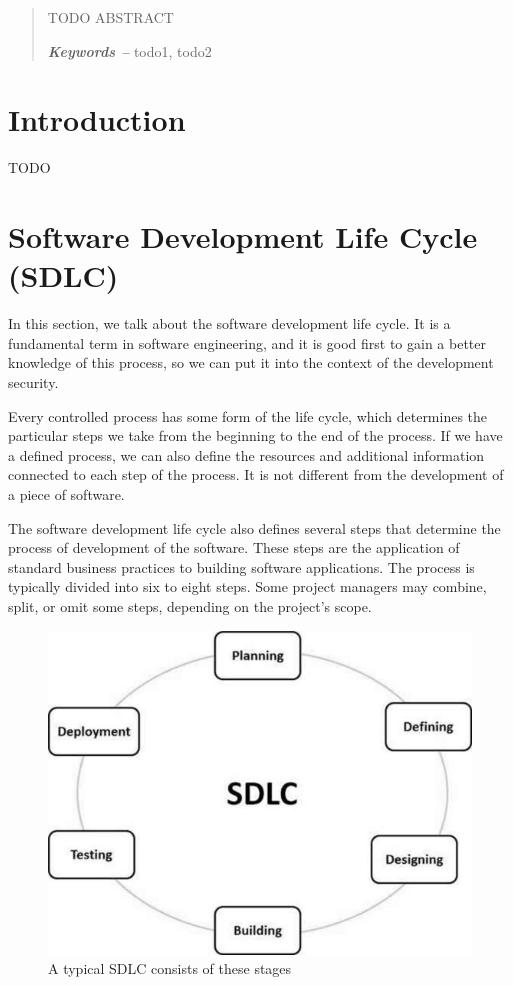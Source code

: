 \documentclass[12pt,a4,twoside]{article}
\providecommand{\keywords}[1]
{
  \small	
  \textbf{\textit{Keywords -- }} #1
}
\begin{document}
\newpage

\begin{abstract}

TODO ABSTRACT\\

\noindent
\keywords{todo1, todo2}
\end{abstract}

\tableofcontents
\newpage

\section*{Introduction}

TODO

\newpage

\section{Software Development Life Cycle (SDLC)}
\label{sec:sdlc}

In this section, we talk about the software development life cycle. It is a fundamental term in software engineering, and it is good first to gain a better knowledge of this process, so we can put it into the context of the development security.

Every controlled process has some form of the life cycle, which determines the particular steps we take from the beginning to the end of the process. If we have a defined process, we can also define the resources and additional information connected to each step of the process. It is not different from the development of a piece of software.

The software development life cycle also defines several steps that determine the process of development of the software. These steps are the application of standard business practices to building software applications. The process is typically divided into six to eight steps. Some project managers may combine, split, or omit some steps, depending on the project's scope. \cite{sdlc_phoenix}

\begin{figure}[h]
\centering
\includegraphics[width=.8\textwidth]{figures/sdlc_stages.jpg}
\caption{A typical SDLC consists of these stages \cite{sdlc_tutorials_point}}
\label{fig:sdlc_stages}
\end{figure}
\end{document}
